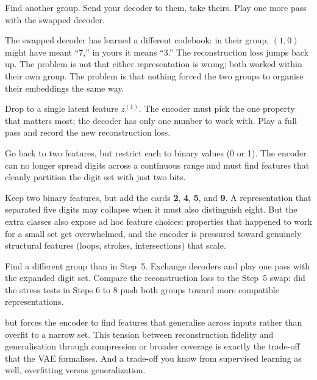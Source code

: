 Find another group. Send your decoder to them, take theirs.
Play one more pass with the swapped decoder.

The swapped decoder has learned a different codebook: in their group, $(1, 0)$ might have meant ``7,''
in yours it means ``3.'' The reconstruction loss jumps back up.
The problem is not that either representation is wrong; both worked within their own group.
The problem is that nothing forced the two groups to organise their embeddings the same way.


Drop to a single latent feature $z^{(1)}$.
The encoder must pick the one property that matters most; the decoder has only one number to work with.
Play a full pass and record the new reconstruction loss.

Go back to two features, but restrict each to binary values (0 or 1).
The encoder can no longer spread digits across a continuous range and must find features that cleanly partition the digit set with just two bits.

Keep two binary features, but add the cards \textbf{2}, \textbf{4}, \textbf{5}, and \textbf{9}.
A representation that separated five digits may collapse when it must also distinguish eight.
But the extra classes also expose ad hoc feature choices: properties that happened to work for a small set get overwhelmed, and the encoder is pressured toward genuinely structural features (loops, strokes, intersections) that scale.

Find a different group than in Step~5. Exchange decoders and play one pass with the expanded digit set.
Compare the reconstruction loss to the Step~5 swap: did the stress tests in Steps 6 to 8 push both groups toward more compatible representations.

 but forces the encoder to find features
that generalise across inputs rather than overfit to a narrow set.
This tension between reconstruction fidelity and generalisation through 
compression or broader coverage
is exactly the trade-off that the VAE formalises.
And a trade-off you know from supervised learning as well, overfitting versus generalization.

